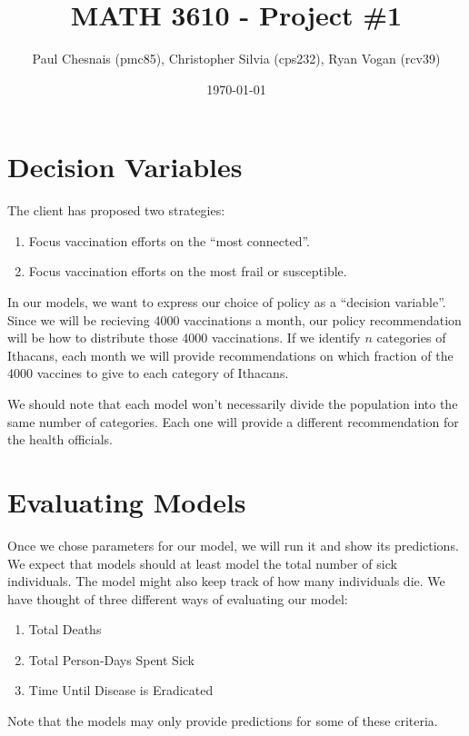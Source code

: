 \documentclass{article}
\title{MATH 3610 - Project \#1}
\author{Paul Chesnais (pmc85), Christopher Silvia (cps232), Ryan Vogan (rcv39)}
\date{\today}
\begin{document}
\maketitle
\thispagestyle{fancy}

\section{Decision Variables}

The client has proposed two strategies:

\begin{enumerate}
\item Focus vaccination efforts on the ``most connected''.
\item Focus vaccination efforts on the most frail or susceptible.
\end{enumerate}

In our models, we want to express our choice of policy as a ``decision variable''.
Since we will be recieving 4000 vaccinations a month, our policy recommendation
	will be how to distribute those 4000 vaccinations.
If we identify $n$ categories of Ithacans, each month we will provide 
	recommendations on which fraction of the 4000 vaccines to give to 
	each category of Ithacans.

We should note that each model won't necessarily divide the population into the
	same number of categories.
Each one will provide a different recommendation for the health officials.

\section{Evaluating Models}

Once we chose parameters for our model, we will run it and show its predictions.
We expect that models should at least model the total number of sick
	individuals.
The model might also keep track of how many individuals die.
We have thought of three different ways of evaluating our model:

\begin{enumerate}
\item Total Deaths
\item Total Person-Days Spent Sick
\item Time Until Disease is Eradicated
\end{enumerate}

Note that the models may only provide predictions for some of these criteria.
\end{document}
